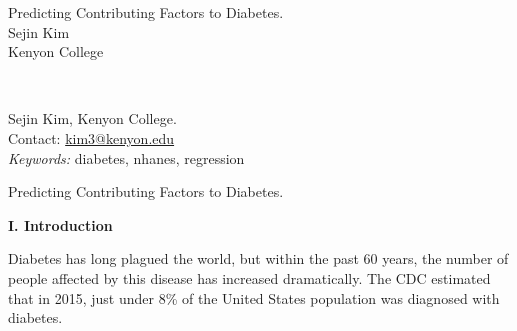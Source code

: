 \documentclass[letter,12pt]{article}
\begin{document}
	\thispagestyle{plain}
	\begin{center}
		\vspace*{150pt}
		Predicting Contributing Factors to Diabetes. \\
		Sejin Kim \\
		Kenyon College \\
	\end{center}
	\vspace*{120pt}
	 \\
	\begin{raggedright}
		Sejin Kim, Kenyon College. \\
		Contact: \href{mailto:kim3@kenyon.edu}{kim3@kenyon.edu} \\
		\vspace*{40pt}
		\textit{Keywords:} diabetes, nhanes, regression
	\end{raggedright}
	
	\newpage

	\begin{center}
		Predicting Contributing Factors to Diabetes.
	\end{center}
	\begin{center}
		\textbf{I. Introduction}
	\end{center}
	\justify
	\indent Diabetes has long plagued the world, but within the past 60 years, the number of people affected by this disease has increased dramatically. The CDC estimated that in 2015, just under 8\% of the United States population was diagnosed with diabetes.
\end{document}
